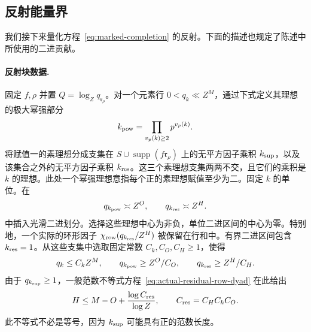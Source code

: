 \subsection{反射能量界}

我们接下来量化方程~\eqref{eq:marked-completion} 的反射。下面的描述也规定了陈述中所使用的二进贡献。

\paragraph{反射块数据.}\label{par:reflected-energy-data}
固定 \(f,\rho\) 并置 \(Q=\log_Zq_{\mathfrak r_\rho}\)。对一个元素行 \(0<q_k\ll Z^M\)，通过下式定义其理想的极大幂强部分
\[
 k_{\rm pow}=\prod_{v_p(k)\ge2}p^{v_p(k)}.
\]
将赋值一的素理想分成支集在 \(S\cup\operatorname{supp}(f\mathfrak r_\rho)\) 上的无平方因子乘积 \(k_{\rm sup}\)，以及该集合之外的无平方因子乘积 \(k_{\rm res}\)。这三个素理想支集两两不交，且它们的乘积是 \(k\) 的理想。此处一个幂强理想意指每个正的素理想赋值至少为二。固定 \(k\) 的单位。在
\[
 q_{k_{\rm pow}}\asymp Z^O,\qquad q_{k_{\rm res}}\asymp Z^H.
\]
中插入光滑二进划分。选择这些理想中心为非负，单位二进区间的中心为零。特别地，一个实际的环形因子 \(\chi_{\rm row}(q_{k_{\rm res}}/Z^H)\) 被保留在行和中。有界二进区间包含 \(k_{\rm res}=1\)。从这些支集中选取固定常数 \(C_k,C_O,C_H\ge1\)，使得
\[
 q_k\le C_kZ^M,\qquad q_{k_{\rm pow}}\ge Z^O/C_O,\qquad
 q_{k_{\rm res}}\ge Z^H/C_H.
\]
由于 \(q_{k_{\rm sup}}\ge1\)，一般范数不等式方程~\eqref{eq:actual-residual-row-dyad} 在此给出
\[
 H\le M-O+\frac{\log C_{\rm res}}{\log Z},
 \qquad C_{\rm res}=C_HC_kC_O.
\]
此不等式不必是等号，因为 \(k_{\rm sup}\) 可能具有正的范数长度。

